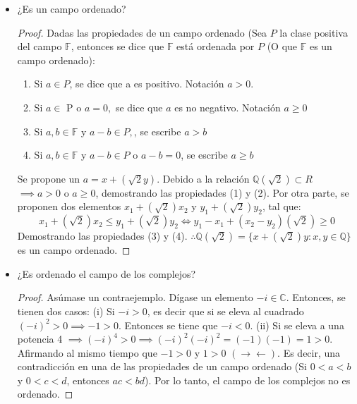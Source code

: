 \documentclass[a4paper,12pt]{article}
\begin{document}
\begin{itemize}
\begin{proof}
    $\therefore \mathbb{Q}(\sqrt{2})=\{x+(\sqrt{2}) y: x, y \in\mathbb{Q}\}$ es un campo. 
    \end{proof}
    \item ¿Es un campo ordenado?
    \begin{proof}
    Dadas las propiedades de un campo ordenado (Sea $P$ la clase positiva del campo $\mathbb{F}$, entonces se dice que $\mathbb{F}$ está ordenada por $P$ (O que $\mathbb{F}$ es un campo ordenado): 
    \begin{enumerate}
        \item  Si $a \in P$, se dice que a es positivo. Notación $a>0$.
        \item Si $a\in$ P o $a=0,$ se dice que $a$ es no negativo. Notación $a \geq 0$
        \item Si $a, b \in \mathbb{F}$ y $a-b \in P,$, se escribe $a>b$
        \item Si $a, b \in \mathbb{F}$ y $a-b \in P$ o $a-b=0$, se escribe $a\geq b$ 
    \end{enumerate}
     Se propone un $a=x+(\sqrt{2}y)$. Debido a la relación $\mathbb{Q}(\sqrt{2})\subset R$ $\implies a>0 $ o $a\geq 0$, demostrando las propiedades (1) y (2).  Por otra parte, se proponen dos elementos $ x_1+(\sqrt2)x_2$ y $y_1+(\sqrt2)y_2$, tal que:
    $$
    x_1+(\sqrt2)x_2 \leq y_1+(\sqrt2)y_2\iff y_1-x_1+(x_2-y_2)(\sqrt2) \geq 0
    $$
    Demostrando las propiedades (3) y (4). $\therefore \mathbb{Q}(\sqrt{2})=\{x+(\sqrt{2}) y: x, y \in\mathbb{Q}\}$ es un campo ordenado.   
    
    \end{proof}
    \item ¿Es ordenado el campo de los complejos?
    \begin{proof}
    Asúmase un contraejemplo. Dígase un elemento $-i\in\mathbb{C}$. Entonces, se tienen dos casos: (i) Si $-i>0$, es decir que si se eleva al cuadrado $(-i)^2>0\implies -1>0$. Entonces se tiene que $-i<0$. (ii) Si se eleva a una potencia 4 $\implies (-i)^4>0 \implies (-i)^2 (-i)^2 = (-1)(-1) = 1>0$. Afirmando al mismo tiempo que $-1>0$ y $1>0$ $(\to\gets)$. Es decir, una contradicción en una de las propiedades de un campo ordenado (Si $0 < a < b$ y $0 < c < d$, entonces $a c < b d$). Por lo tanto, el campo de los complejos no es ordenado.   
    \end{proof}
\end{itemize}




\end{document}

